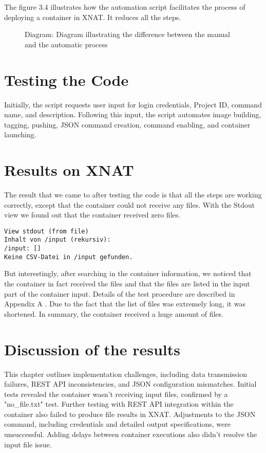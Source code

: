 The figure 3.4 illustrates how the automation script facilitates the process of deploying a container in XNAT. It reduces all the steps.

\begin{figure}[ht]
    \centering
    \def\svgwidth{0.9\linewidth}
    
    \caption{Diagram: Diagram illustrating the difference between the manual and the automatic process}
    \label{fig:enter-label}
\end{figure}



\section{Testing the Code}
Initially, the script requests user input for login credentials, Project ID, command name, and description. Following this input, the script automates image building, tagging, pushing, JSON command creation, command enabling, and container launching.

\section{Results on XNAT}
The result that we came to after testing the code is that all the steps are working correctly, except that the container could not receive any files. With the \ac{Stdout} view we found out that the container received zero files. 
 
\begin{lstlisting}[numbers=none]
View stdout (from file)
Inhalt von /input (rekursiv):
/input: []
Keine CSV-Datei in /input gefunden.
\end{lstlisting}


But interestingly, after searching in the container information, we noticed that the container in fact received the files and that the files are listed in the input part of the container input. 
Details of the test procedure are described in Appendix A \cite{bousfiha2025appendix}. Due to the fact that the list of files was extremely long, it was shortened. In summary, the container received a huge amount of files.

\section{Discussion of the results}
This chapter outlines implementation challenges, including data transmission failures, REST API inconsistencies, and JSON configuration mismatches. Initial tests revealed the container wasn't receiving input files, confirmed by a "no\_file.txt" test. Further testing with REST API integration within the container also failed to produce file results in XNAT. Adjustments to the JSON command, including credentials and detailed output specifications, were unsuccessful. Adding delays between container executions also didn't resolve the input file issue.

